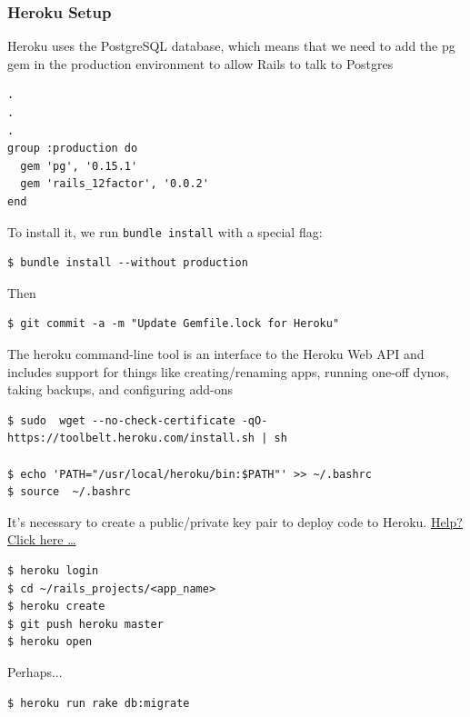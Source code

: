 \documentclass{beamer}
\newcommand{\commandinline}[1]{\lstinline[basicstyle=\small\lstfontfamily]{#1}}
\begin{document}
\begin{frame}
\frametitle{Heroku Setup} 
Heroku uses the PostgreSQL database, which means that we need to add the pg gem in the production environment to allow Rails to talk to Postgres
\lstset{language=ruby, style=eclipse}
\begin{lstlisting}
.
.
.
group :production do
  gem 'pg', '0.15.1'
  gem 'rails_12factor', '0.0.2'
end
\end{lstlisting}
To install it, we run \commandinline{bundle install} with a special flag:
\lstset{language=shell}
\begin{lstlisting}[escapechar=!]
$ bundle install --without production
\end{lstlisting}
Then 
\begin{lstlisting}[escapechar=!]
$ git commit -a -m "Update Gemfile.lock for Heroku"
\end{lstlisting}

The heroku command-line tool is an interface to the Heroku Web API and includes support for things like creating/renaming apps, running one-off dynos, taking backups, and configuring add-ons

\begin{lstlisting}[escapechar=!]
$ sudo  wget --no-check-certificate -qO- https://toolbelt.heroku.com/install.sh | sh

$ echo 'PATH="/usr/local/heroku/bin:$PATH"' >> ~/.bashrc
$ source  ~/.bashrc
\end{lstlisting}

It's necessary to create a public/private key pair to deploy code to Heroku. \href{https://devcenter.heroku.com/articles/keys}{\alert{Help? Click here \dots}}

\begin{lstlisting}[escapechar=!]
$ heroku login
$ cd ~/rails_projects/<app_name>
$ heroku create
$ git push heroku master
$ heroku open
\end{lstlisting}

Perhaps...
\begin{lstlisting}[escapechar=!]
$ heroku run rake db:migrate
\end{lstlisting}

\end{frame}
\end{document}
